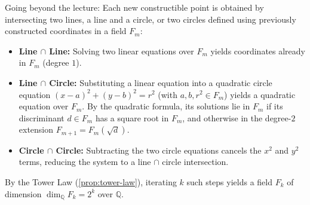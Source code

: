 \begin{content}
\begin{center}
\end{center}

\begin{steps}
Going beyond the lecture: Each new constructible point is obtained by intersecting two lines, a line and a circle, or two circles defined using previously constructed coordinates in a field $F_m$:
\begin{itemize}
    \item \textbf{Line $\cap$ Line:} Solving two linear equations over $F_m$ yields coordinates already in $F_m$ (degree $1$).
    \item \textbf{Line $\cap$ Circle:} Substituting a linear equation into a quadratic circle equation $(x - a)^2 + (y - b)^2 = r^2$ (with $a, b, r^2 \in F_m$) yields a quadratic equation over $F_m$. By the quadratic formula, its solutions lie in $F_m$ if its discriminant $d \in F_m$ has a square root in $F_m$, and otherwise in the degree-$2$ extension $F_{m+1} = F_m(\sqrt{d})$.
    \item \textbf{Circle $\cap$ Circle:} Subtracting the two circle equations cancels the $x^2$ and $y^2$ terms, reducing the system to a line $\cap$ circle intersection.
\end{itemize}
By the Tower Law (\cref{prop:tower-law}), iterating $k$ such steps yields a field $F_k$ of dimension $\dim_{\mathbb{Q}} F_k = 2^k$ over $\mathbb{Q}$.
\end{steps}
\end{content}

